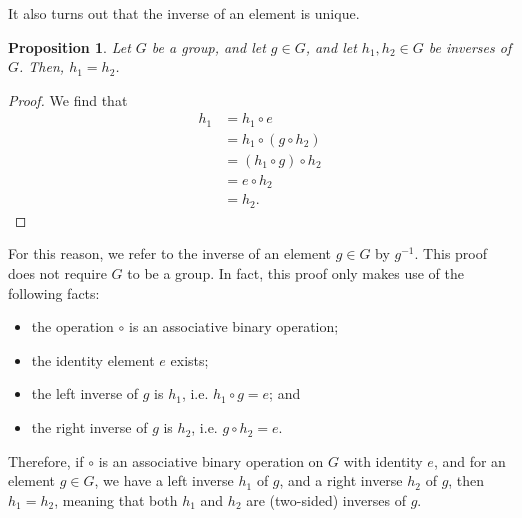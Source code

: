 \documentclass[a4paper, openany]{memoir}
\theoremstyle{definition}
\theoremstyle{plain}
\newtheorem{proposition}[definition]{Proposition}
\begin{document}
It also turns out that the inverse of an element is unique.
\begin{proposition}
Let $G$ be a group, and let $g \in G$, and let $h_1, h_2 \in G$ be inverses of $G$. Then, $h_1 = h_2$.
\end{proposition}
\begin{proof}
We find that
\begin{align*}
    h_1 &= h_1 \circ e \\
    &= h_1 \circ (g \circ h_2) \\
    &= (h_1 \circ g) \circ h_2 \\
    &= e \circ h_2 \\
    &= h_2.
\end{align*}
\end{proof}
\noindent For this reason, we refer to the inverse of an element $g \in G$ by $g^{-1}$. This proof does not require $G$ to be a group. In fact, this proof only makes use of the following facts:
\begin{itemize}
    \item the operation $\circ$ is an associative binary operation;
    \item the identity element $e$ exists;
    \item the left inverse of $g$ is $h_1$, i.e. $h_1 \circ g = e$; and
    \item the right inverse of $g$ is $h_2$, i.e. $g \circ h_2 = e$.
\end{itemize}
Therefore, if $\circ$ is an associative binary operation on $G$ with identity $e$, and for an element $g \in G$, we have a left inverse $h_1$ of $g$, and a right inverse $h_2$ of $g$, then $h_1 = h_2$, meaning that both $h_1$ and $h_2$ are (two-sided) inverses of $g$.
\end{document}
